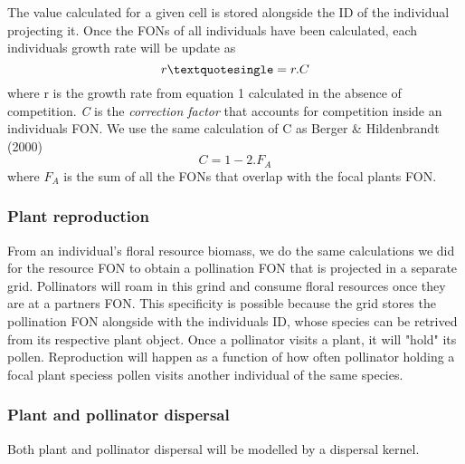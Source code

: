 \documentclass[11pt, a4paper]{article}
\begin{document}
The value calculated for a given cell is stored alongside the ID of the individual projecting it. Once the FONs of all individuals have been calculated, each individual\textquotesingle s growth rate will be update as
\begin{equation}
 r\textquotesingle = r.C
\end{equation}
where r is the growth rate from equation 1 calculated in the absence of competition. \textit{C} is  the \textit{correction factor} that accounts for competition inside an individual\textquotesingle s FON. We use the same calculation of C as Berger \& Hildenbrandt (2000)\cite{BergerHildebrandt2000}
\begin{equation}
 C = 1 - 2.F_A
\end{equation}
where $F_A$ is the sum of all the FONs that overlap with the focal plant\textquotesingle s FON.

\subsubsection{Plant reproduction}
From an individual's floral resource biomass, we do the same calculations we did for the resource FON to obtain a pollination FON that is projected in a separate grid. Pollinators will roam in this grind and consume floral resources once they are at a partner\texquotesingle s FON. This specificity is possible because the grid stores the pollination FON alongside with the individual\textquotesingle s ID, whose species can be retrived from its respective plant object. Once a pollinator visits a plant, it will "hold" its pollen. Reproduction will happen as a function of how often pollinator holding a focal plant species\textquotesingle s pollen visits another individual of the same species.

\subsubsection{Plant and pollinator dispersal}
Both plant and pollinator dispersal will be modelled by a dispersal kernel.

\medskip
\end{document}
